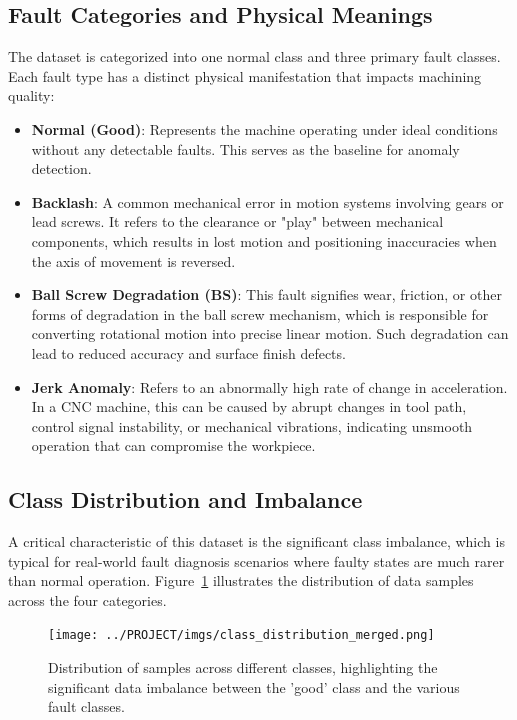 \subsection{Fault Categories and Physical Meanings}
The dataset is categorized into one normal class and three primary fault classes. Each fault type has a distinct physical manifestation that impacts machining quality:
\begin{itemize}
    \item \textbf{Normal (Good)}: Represents the machine operating under ideal conditions without any detectable faults. This serves as the baseline for anomaly detection.
    \item \textbf{Backlash}: A common mechanical error in motion systems involving gears or lead screws. It refers to the clearance or "play" between mechanical components, which results in lost motion and positioning inaccuracies when the axis of movement is reversed.
    \item \textbf{Ball Screw Degradation (BS)}: This fault signifies wear, friction, or other forms of degradation in the ball screw mechanism, which is responsible for converting rotational motion into precise linear motion. Such degradation can lead to reduced accuracy and surface finish defects.
    \item \textbf{Jerk Anomaly}: Refers to an abnormally high rate of change in acceleration. In a CNC machine, this can be caused by abrupt changes in tool path, control signal instability, or mechanical vibrations, indicating unsmooth operation that can compromise the workpiece.
\end{itemize}

\subsection{Class Distribution and Imbalance}
A critical characteristic of this dataset is the significant class imbalance, which is typical for real-world fault diagnosis scenarios where faulty states are much rarer than normal operation. Figure~\ref{fig:class_distribution_merged} illustrates the distribution of data samples across the four categories.

\begin{figure}[h!]
    \centering
    \texttt{[image: ../PROJECT/imgs/class\_distribution\_merged.png]}
    \caption{Distribution of samples across different classes, highlighting the significant data imbalance between the 'good' class and the various fault classes.}
    \label{fig:class_distribution_merged}
\end{figure}

